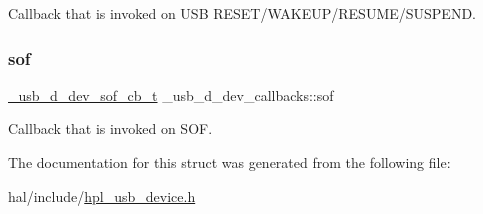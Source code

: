 Callback that is invoked on U\+SB R\+E\+S\+E\+T/\+W\+A\+K\+E\+U\+P/\+R\+E\+S\+U\+M\+E/\+S\+U\+S\+P\+E\+ND. \mbox{\label{struct__usb__d__dev__callbacks_a00d27a1f4163f958e060785f5b67e34f}} 
\subsubsection{\texorpdfstring{sof}{sof}}
{\footnotesize\ttfamily \hyperlink{hpl__usb__device_8h_a1e88b838737e28bdde5f01990388acf3}{\+\_\+usb\+\_\+d\+\_\+dev\+\_\+sof\+\_\+cb\+\_\+t} \+\_\+usb\+\_\+d\+\_\+dev\+\_\+callbacks\+::sof}

Callback that is invoked on S\+OF. 

The documentation for this struct was generated from the following file\+:\begin{DoxyCompactItemize}
\item 
hal/include/\hyperlink{hpl__usb__device_8h}{hpl\+\_\+usb\+\_\+device.\+h}\end{DoxyCompactItemize}
